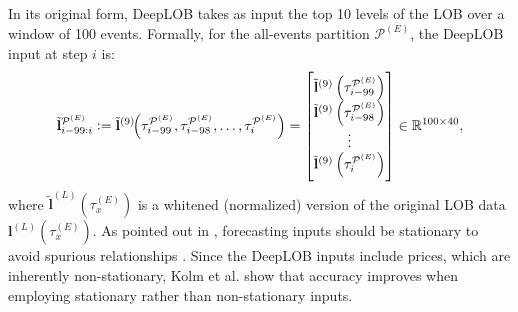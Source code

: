 \documentclass[10pt,a4paper,oneside]{article}
\providecommand{\DIFaddbegin}{} %
\providecommand{\DIFaddend}{} %
\providecommand{\DIFdelbegin}{} %
\providecommand{\DIFdelend}{} %
\newcommand{\DIFscaledelfig}{0.5}
\newlength{\DIFdelgraphicswidth} %
\newlength{\DIFdelgraphicsheight} %
\newcommand{\DIFaddincludegraphics}[2][]{{\color{blue}\fbox{\DIFOincludegraphics[#1]{#2}}}} %
\newcommand{\DIFdelincludegraphics}[2][]{%
\sbox{\DIFdelgraphicsbox}{\DIFOincludegraphics[#1]{#2}}%
\settoboxwidth{\DIFdelgraphicswidth}{\DIFdelgraphicsbox} %
\settoboxtotalheight{\DIFdelgraphicsheight}{\DIFdelgraphicsbox} %
\scalebox{\DIFscaledelfig}{%
\parbox[b]{\DIFdelgraphicswidth}{\usebox{\DIFdelgraphicsbox}\\[-\baselineskip] \rule{\DIFdelgraphicswidth}{0em}}\llap{\resizebox{\DIFdelgraphicswidth}{\DIFdelgraphicsheight}{%
\setlength{\unitlength}{\DIFdelgraphicswidth}%
\begin{picture}(1,1)%
\thicklines\linethickness{2pt} %
{\color[rgb]{1,0,0}\put(0,0){\framebox(1,1){}}}%
{\color[rgb]{1,0,0}\put(0,0){\line( 1,1){1}}}%
{\color[rgb]{1,0,0}\put(0,1){\line(1,-1){1}}}%
\end{picture}%
}\hspace*{3pt}}} %
} %
\DeclareRobustCommand{\DIFaddbegin}{\DIFOaddbegin \let\includegraphics\DIFaddincludegraphics} %
\DeclareRobustCommand{\DIFaddend}{\DIFOaddend \let\includegraphics\DIFOincludegraphics} %
\DeclareRobustCommand{\DIFdelbegin}{\DIFOdelbegin \let\includegraphics\DIFdelincludegraphics} %
\DeclareRobustCommand{\DIFdelend}{\DIFOaddend \let\includegraphics\DIFOincludegraphics} %
\begin{document}
\DIFdelend In its original form, DeepLOB takes as input the top 10 levels of the LOB over a window of 100 events. Formally, for the all-events partition $\mathcal{P}^{(E)}$, the DeepLOB input at step $i$ is:
\[
    \tilde{\mathbf{l}}^{\mathcal{P}^{(E)}}_{i - 99 : i}
    :=
    \tilde{\mathbf{l}}^{(9)}\!\Bigl(\tau^{\mathcal{P}^{(E)}}_{i - 99}, \tau^{\mathcal{P}^{(E)}}_{i - 98}, \dots , \tau^{\mathcal{P}^{(E)}}_{i}\Bigr)
    =
    \DIFdelbegin %
\DIFdelend \DIFaddbegin \begin{bmatrix}
        \tilde{\mathbf{l}}^{(9)}\left(\tau^{\mathcal{P}^{(E)}}_{i - 99}\right) \\
        \tilde{\mathbf{l}}^{(9)}\left(\tau^{\mathcal{P}^{(E)}}_{i - 98}\right) \\
        \vdots                                                                 \\
        \tilde{\mathbf{l}}^{(9)}\left(\tau^{\mathcal{P}^{(E)}}_{i}\right)
    \end{bmatrix}\DIFaddend 
    \in \mathbb{R}^{100 \times 40},
\]
where $\tilde{\mathbf{l}}^{(L)}(\tau^{(E)}_x)$ is a whitened (normalized) version of the original LOB data $\mathbf{l}^{(L)}(\tau^{(E)}_x)$. As pointed out in \cite{kolm2023deep}, forecasting inputs should be stationary to avoid spurious relationships \cite{granger1974spurious, phillips1986understanding}. Since the DeepLOB inputs include prices, which are inherently non-stationary, Kolm et al. \cite{kolm2023deep} show that accuracy improves when employing stationary rather than non-stationary inputs. \DIFdelbegin %
\end{document}
